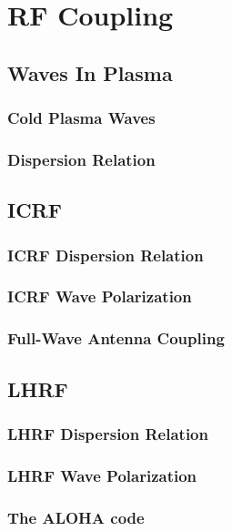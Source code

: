 \chapter{RF Coupling}
\label{chap:rf_coupling}
\margintoc

\section{Waves In Plasma}
\subsection{Cold Plasma Waves}
\subsection{Dispersion Relation}


\section{ICRF}
\subsection{ICRF Dispersion Relation}
\subsection{ICRF Wave Polarization}
\subsection{Full-Wave Antenna Coupling}

\section{LHRF}
\subsection{LHRF Dispersion Relation}
\subsection{LHRF Wave Polarization}

\subsection{The ALOHA code}

